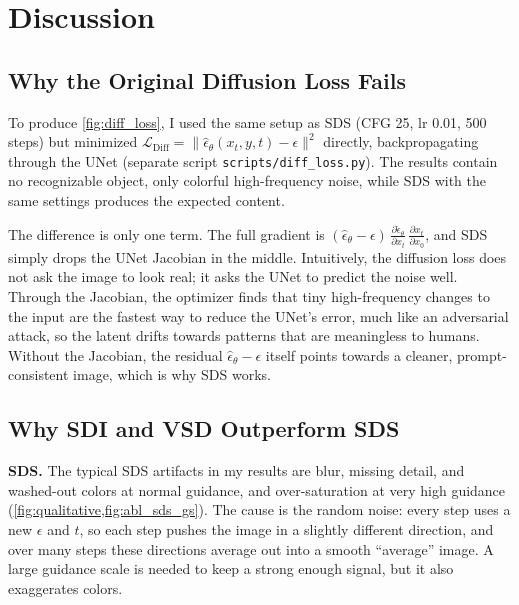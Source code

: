 \section{Discussion}
\label{sec:discussion}

\subsection{Why the Original Diffusion Loss Fails}
\label{sec:diff_loss}

To produce \cref{fig:diff_loss}, I used the same setup as SDS (CFG 25, lr 0.01, 500 steps) but minimized $\mathcal L_{\text{Diff}} = \|\hat\epsilon_\theta(x_t, y, t) - \epsilon\|^2$ directly, backpropagating through the UNet (separate script \texttt{scripts/diff\_loss.py}).
The results contain no recognizable object, only colorful high-frequency noise, while SDS with the same settings produces the expected content.

The difference is only one term.
The full gradient is $(\hat\epsilon_\theta - \epsilon)\,\frac{\partial \hat\epsilon_\theta}{\partial x_t}\,\frac{\partial x_t}{\partial x_0}$, and SDS simply drops the UNet Jacobian in the middle.
Intuitively, the diffusion loss does not ask the image to look real; it asks the UNet to predict the noise well.
Through the Jacobian, the optimizer finds that tiny high-frequency changes to the input are the fastest way to reduce the UNet's error, much like an adversarial attack, so the latent drifts towards patterns that are meaningless to humans.
Without the Jacobian, the residual $\hat\epsilon_\theta - \epsilon$ itself points towards a cleaner, prompt-consistent image, which is why SDS works.

\subsection{Why SDI and VSD Outperform SDS}
\label{sec:why_better}

\noindent\textbf{SDS.}
The typical SDS artifacts in my results are blur, missing detail, and washed-out colors at normal guidance, and over-saturation at very high guidance (\cref{fig:qualitative,fig:abl_sds_gs}).
The cause is the random noise: every step uses a new $\epsilon$ and $t$, so each step pushes the image in a slightly different direction, and over many steps these directions average out into a smooth ``average'' image.
A large guidance scale is needed to keep a strong enough signal, but it also exaggerates colors.

